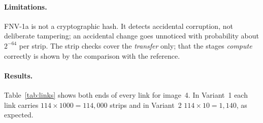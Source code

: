 \documentclass[11pt,a4paper]{article}
\begin{document}
\paragraph{Limitations.} FNV-1a is not a cryptographic hash. It detects accidental corruption,
not deliberate tampering; an accidental change goes unnoticed with probability about $2^{-64}$
per strip. The strip checks cover the \emph{transfer} only; that the stages \emph{compute}
correctly is shown by the comparison with the reference.

\paragraph{Results.} Table~\ref{tab:links} shows both ends of every link for image~4. In Variant~1 each link carries
$114\times1000 = 114{,}000$ strips and in Variant~2 $114\times10 = 1{,}140$, as expected.
\end{document}
